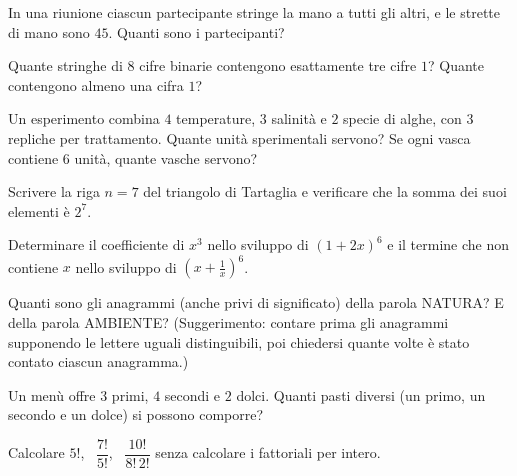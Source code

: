\begin{esercizio}[\liv{2}]
In una riunione ciascun partecipante stringe la mano a tutti gli altri, e le strette di mano sono $45$. Quanti sono i partecipanti?
\end{esercizio}

\begin{esercizio}[\liv{2}]
Quante stringhe di $8$ cifre binarie contengono esattamente tre cifre $1$? Quante contengono almeno una cifra $1$?
\end{esercizio}

\begin{esercizio}[\liv{2}]
Un esperimento combina $4$ temperature, $3$ salinit\`a e $2$ specie di alghe, con $3$ repliche per trattamento. Quante unit\`a sperimentali servono? Se ogni vasca contiene $6$ unit\`a, quante vasche servono?
\end{esercizio}

\begin{esercizio}[\liv{2}]
Scrivere la riga $n=7$ del triangolo di Tartaglia e verificare che la somma dei suoi elementi \`e $2^{7}$.
\end{esercizio}

\begin{esercizio}[\liv{2}]
Determinare il coefficiente di $x^{3}$ nello sviluppo di $(1+2x)^{6}$ e il termine che non contiene $x$ nello sviluppo di $\left(x+\frac1x\right)^{6}$.
\end{esercizio}

\begin{esercizio}[\liv{3}]
Quanti sono gli anagrammi (anche privi di significato) della parola NATURA? E della parola AMBIENTE? (Suggerimento: contare prima gli anagrammi supponendo le lettere uguali distinguibili, poi chiedersi quante volte \`e stato contato ciascun anagramma.)
\end{esercizio}

\begin{esercizio}[\liv{1}]
Un menù offre $3$ primi, $4$ secondi e $2$ dolci. Quanti pasti diversi (un primo, un secondo e un dolce) si possono comporre?
\end{esercizio}

\begin{esercizio}[\liv{1}]
Calcolare $5!$, \ $\dfrac{7!}{5!}$, \ $\dfrac{10!}{8!\,2!}$ senza calcolare i fattoriali per intero.
\end{esercizio}

